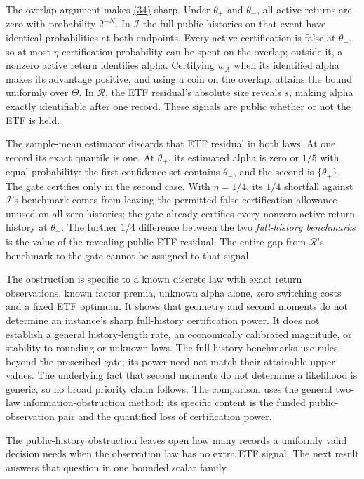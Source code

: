 \documentclass[11pt]{article}
\begin{document}
The overlap argument makes \hyperref[eq:34]{(34)} sharp. Under \(\theta_+\)
and \(\theta_-\), all active returns are zero with probability
\(2^{-N}\). In \(\mathcal I\) the full public histories on
that event have identical probabilities at both endpoints.
Every active certification is false at \(\theta_-\), so at
most \(\eta\) certification probability can be spent on the
overlap; outside it, a nonzero active return identifies alpha.
Certifying \(w_A\) when its identified alpha makes its
advantage positive, and using a coin on the overlap, attains
the bound uniformly over \(\Theta\). In \(\mathcal R\), the
ETF residual's absolute size reveals \(s\), making alpha
exactly identifiable after one record. These signals are
public whether or not the ETF is held.

The sample-mean estimator discards that ETF residual in both
laws. At one record its exact quantile is one. At
\(\theta_+\), its estimated alpha is zero or \(1/5\) with
equal probability: the first confidence set contains
\(\theta_-\), and the second is \(\{\theta_+\}\).
The gate certifies only in the second case. With
\(\eta=1/4\), its \(1/4\) shortfall against
\(\mathcal I\)'s benchmark comes from leaving the permitted
false-certification allowance unused on all-zero histories;
the gate already certifies every nonzero active-return history
at \(\theta_+\). The further \(1/4\) difference between
the two \emph{full-history benchmarks} is the value of the
revealing public ETF residual. The entire gap from
\(\mathcal R\)'s benchmark to the gate cannot be assigned to
that signal.

The obstruction is specific to a known discrete law with exact
return observations, known factor premia, unknown alpha alone,
zero switching costs and a fixed ETF optimum. It shows that
geometry and second moments do not determine an instance's
sharp full-history certification power. It does not establish
a general history-length rate, an economically calibrated
magnitude, or stability to rounding or unknown laws. The
full-history benchmarks use rules beyond the prescribed gate;
its power need not match their attainable upper values. The
underlying fact that second moments do not determine a
likelihood is generic, so no broad priority claim follows.
The comparison uses the general two-law information-obstruction
method; its specific content is the funded public-observation pair
and the quantified loss of certification power.

The public-history obstruction leaves open how many records a
uniformly valid decision needs when the observation law has no
extra ETF signal. The next result answers that question in one
bounded scalar family.
\end{document}
